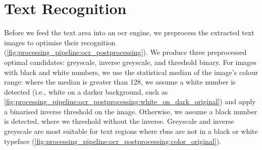 \section{Text Recognition}
\label{sec:processing_pipeline:text_recognition}

Before we feed the text area into an \gls{ocr} engine, we preprocess the extracted text images to optimise their recognition (\cref{fig:processing_pipeline:ocr_postprocessing}). We produce three preprocessed optimal candidates: greyscale, inverse greyscale, and threshold binary. For images with black and white numbers, we use the statistical median of the image's colour range: where the median is greater than 128, we assume a white number is detected (i.e., white on a darker background, such as \cref{fig:processing_pipeline:ocr_postprocessing:white_on_dark_original}) and apply a binarised inverse threshold on the image. Otherwise, we assume a black number is detected, where we threshold without the inverse. Greyscale and inverse greyscale are most suitable for text regions where \glspl{rbn} are not in a black or white typeface (\cref{fig:processing_pipeline:ocr_postprocessing:color_original}).


